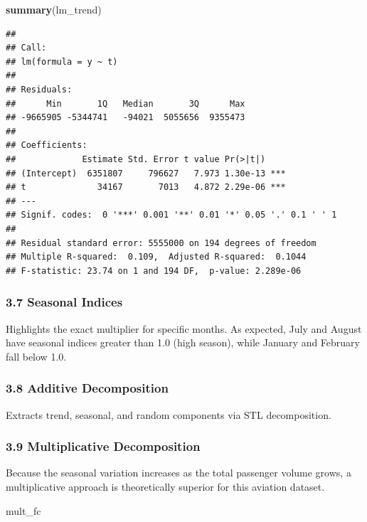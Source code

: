 \documentclass[
]{article}
\newenvironment{Shaded}{\begin{snugshade}}{\end{snugshade}}
\newcommand{\FunctionTok}[1]{\textcolor[rgb]{0.13,0.29,0.53}{\textbf{#1}}}
\newcommand{\NormalTok}[1]{#1}
\begin{document}
\begin{Shaded}
\begin{Highlighting}[]
\FunctionTok{summary}\NormalTok{(lm\_trend)}
\end{Highlighting}
\end{Shaded}

\begin{verbatim}
## 
## Call:
## lm(formula = y ~ t)
## 
## Residuals:
##      Min       1Q   Median       3Q      Max 
## -9665905 -5344741   -94021  5055656  9355473 
## 
## Coefficients:
##             Estimate Std. Error t value Pr(>|t|)    
## (Intercept)  6351807     796627   7.973 1.30e-13 ***
## t              34167       7013   4.872 2.29e-06 ***
## ---
## Signif. codes:  0 '***' 0.001 '**' 0.01 '*' 0.05 '.' 0.1 ' ' 1
## 
## Residual standard error: 5555000 on 194 degrees of freedom
## Multiple R-squared:  0.109,  Adjusted R-squared:  0.1044 
## F-statistic: 23.74 on 1 and 194 DF,  p-value: 2.289e-06
\end{verbatim}

\subsubsection{3.7 Seasonal Indices}\label{seasonal-indices}

Highlights the exact multiplier for specific months. As expected, July
and August have seasonal indices greater than 1.0 (high season), while
January and February fall below 1.0.

\subsubsection{3.8 Additive Decomposition}\label{additive-decomposition}

Extracts trend, seasonal, and random components via STL decomposition.

\subsubsection{3.9 Multiplicative
Decomposition}\label{multiplicative-decomposition}

Because the seasonal variation increases as the total passenger volume
grows, a multiplicative approach is theoretically superior for this
aviation dataset.

\begin{Shaded}
\begin{Highlighting}[]
\NormalTok{mult\_fc}
\end{Highlighting}
\end{Shaded}
\end{document}
